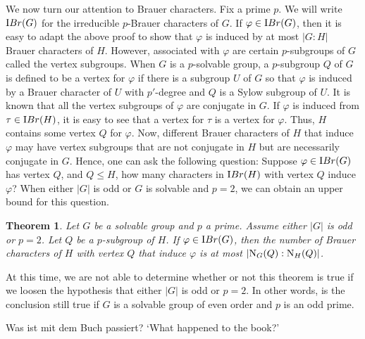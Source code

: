 \documentclass[12pt]{article}
\newtheorem{theorem}{Theorem}%
\def\ibr#1{{\textrm IBr} (#1)}
\def\norm#1#2{{\textrm N}_{#1} (#2)}
\def\phi{\varphi}
\begin{document}
We now turn our attention to Brauer characters.  Fix a prime $p$. We
will write $\ibr G$ for the irreducible $p$-Brauer characters of
$G$.  If $\phi \in \ibr G$, then it is easy to adapt the above proof
to show that $\phi$ is induced by at most $|G:H|$ Brauer characters
of $H$.  However, associated with $\phi$ are certain $p$-subgroups
of $G$ called the vertex subgroups.  When $G$ is a $p$-solvable
group, a $p$-subgroup $Q$ of $G$ is defined to be a vertex for
$\phi$ if there is a subgroup $U$ of $G$ so that $\phi$ is induced
by a Brauer character of $U$ with $p'$-degree and $Q$ is a Sylow
subgroup of $U$.  It is known that all the vertex subgroups of
$\phi$ are conjugate in $G$. If $\phi$ is induced from $\tau \in
\ibr H$, it is easy to see that a vertex for $\tau$ is a vertex for
$\phi$.  Thus, $H$ contains some vertex $Q$ for $\phi$.  Now,
different Brauer characters of $H$ that induce $\phi$ may have
vertex subgroups that are not conjugate in $H$ but are necessarily
conjugate in $G$. Hence, one can ask the following question: Suppose
$\phi \in \ibr G$ has vertex $Q$, and $Q \le H$, how many characters
in $\ibr H$ with vertex $Q$ induce $\phi$?  When either $|G|$ is odd
or $G$ is solvable and $p = 2$, we can obtain an upper bound for
this question.

\begin{theorem} \label{main}
Let $G$ be a solvable group and $p$ a prime.  Assume either $|G|$ is
odd or $p = 2$. Let $Q$ be a $p$-subgroup of $H$. If $\phi \in \ibr
G$, then the number of Brauer characters of $H$ with vertex $Q$ that
induce $\phi$ is at most $|\norm GQ:\norm HQ|$.
\end{theorem}

At this time, we are not able to determine whether or not this
theorem is true if we loosen the hypothesis that either $|G|$ is odd
or $p = 2$.  In other words, is the conclusion still true if $G$ is
a solvable group of even order and $p$ is an odd prime. 



\begin{exe}
\end{exe}

\begin{exe}
\ex Was ist mit dem Buch passiert? \quad `What happened to the book?' \label{pulli-q}
\begin{xlist}
\end{xlist}
\end{exe}
\end{document}
